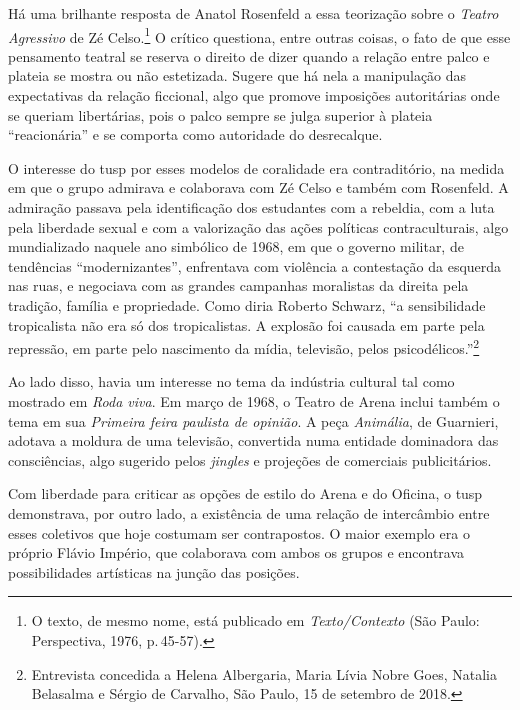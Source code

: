 Há uma brilhante resposta de Anatol Rosenfeld a essa teorização sobre o
{\it Teatro Agressivo} de Zé Celso.\footnote{O texto, de mesmo nome,
  está publicado em {\it Texto/Contexto} (São Paulo: Perspectiva, 1976,
  p.\,45-57).} O crítico questiona, entre outras coisas, o fato de que
esse pensamento teatral se reserva o direito de dizer quando a relação
entre palco e plateia se mostra ou não estetizada. Sugere que há nela a
manipulação das expectativas da relação ficcional, algo que promove
imposições autoritárias onde se queriam libertárias, pois o palco sempre
se julga superior à plateia “reacionária” e se comporta como autoridade
do desrecalque.

O interesse do {\sc tusp} por esses modelos de coralidade era contraditório,
na medida em que o grupo admirava e colaborava com Zé Celso e também com
Rosenfeld. A admiração passava pela identificação dos estudantes com a
rebeldia, com a luta pela liberdade sexual e com a valorização das ações
políticas contraculturais, algo mundializado naquele ano simbólico de
1968, em que o governo militar, de tendências “modernizantes”,
enfrentava com violência a contestação da esquerda nas ruas, e negociava
com as grandes campanhas moralistas da direita pela tradição, família e
propriedade. Como diria Roberto Schwarz, “a sensibilidade tropicalista
não era só dos tropicalistas. A explosão foi causada em parte pela
repressão, em parte pelo nascimento da mídia, televisão, pelos
psicodélicos.”\footnote{Entrevista concedida a Helena Albergaria, Maria
  Lívia Nobre Goes, Natalia Belasalma e Sérgio de Carvalho, São Paulo,
  15 de setembro de 2018.}

Ao lado disso, havia um interesse no tema da indústria cultural tal como
mostrado em {\it Roda viva}. Em março de 1968, o Teatro de Arena inclui
também o tema em sua {\it Primeira feira paulista de opinião}. A peça
{\it Animália}, de Guarnieri, adotava a moldura de uma televisão,
convertida numa entidade dominadora das consciências, algo sugerido
pelos {\it jingles} e projeções de comerciais publicitários.

Com liberdade para criticar as opções de estilo do Arena e do Oficina, o
{\sc tusp} demonstrava, por outro lado, a existência de uma relação de
intercâmbio entre esses coletivos que hoje costumam ser contrapostos. O
maior exemplo era o próprio Flávio Império, que colaborava com ambos os
grupos e encontrava possibilidades artísticas na junção das posições.

